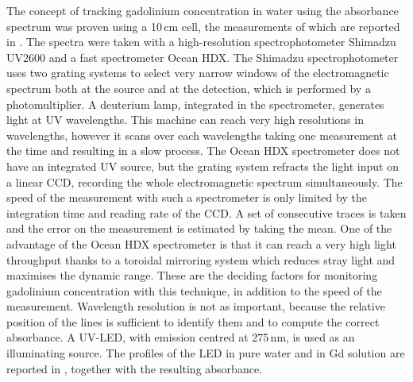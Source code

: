 The concept of tracking gadolinium concentration in water using the absorbance spectrum %
was proven using a 10\,cm cell, the measurements of which are reported in .
The spectra were taken with a high-resolution spectrophotometer Shimadzu UV2600 %
and a fast spectrometer Ocean HDX. %
The Shimadzu spectrophotometer uses two grating systems to select very narrow windows of the electromagnetic spectrum %
both at the source and at the detection, which is performed by a photomultiplier.
A deuterium lamp, integrated in the spectrometer, generates light at UV wavelengths.
This machine can reach very high resolutions in wavelengths, however it scans over each wavelengths %
taking one measurement at the time and resulting in a slow process.
The Ocean HDX spectrometer does not have an integrated UV source, %
but the grating system refracts the light input on a linear CCD, recording the whole %
electromagnetic spectrum simultaneously.
The speed of the measurement with such a spectrometer is only limited by the integration time %
and reading rate of the CCD.
A set of consecutive traces is taken and the error on the measurement is estimated by taking the mean.
One of the advantage of the Ocean HDX spectrometer is that it can reach a very high light throughput %
thanks to a toroidal mirroring system which reduces stray light and maximises the dynamic range.
These are the deciding factors for monitoring gadolinium concentration with this technique, %
in addition to the speed of the measurement.
Wavelength resolution is not as important, because the relative position of the lines is sufficient %
to identify them and to compute the correct absorbance.
A UV-LED, with emission centred at 275\,nm, is used as an illuminating source.
The profiles of the LED in pure water and in Gd solution are reported in , %
together with the resulting absorbance.

